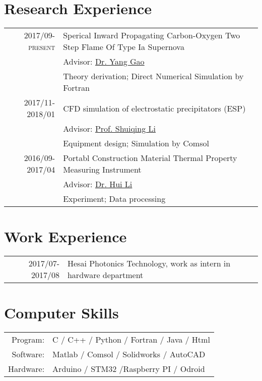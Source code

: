 \documentclass[a4paper,10pt]{article}
\begin{document}
\section{Research Experience}
\begin{tabular}{rl}
\textsc{2017/09-present} & Sperical Inward Propagating Carbon-Oxygen Two Step Flame Of Type Ia Supernova \\
                         & \small Advisor: \href{http://www.tsinghua.edu.cn/publish/teen/2472/2016/20160429193334896914447/20160429193334896914447_.html}{Dr. Yang Gao} \\
                         & Theory derivation; Direct Numerical Simulation by Fortran \\
\textsc{2017/11-2018/01} & CFD simulation of electrostatic precipitators (ESP)\\
                         & \small Advisor: \href{http://www.tsinghua.edu.cn/publish/teen/2472/2010/20101222191303970621540/20101222191303970621540_.html}{Prof. Shuiqing Li} \\
                         & Equipment design; Simulation by Comsol \\
\textsc{2016/09-2017/04} & Portabl Construction Material Thermal Property Measuring Instrument \\
                         & \small Advisor: \href{http://www.tsinghua.edu.cn/publish/te/2230/2017/20170816112830349410941/20170816112830349410941_.html}{Dr. Hui Li} \\
                         & Experiment; Data processing \\
\end{tabular}

\section{Work Experience}
\begin{tabular}{rl}
\textsc{2017/07-2017/08} &  Hesai Photonics Technology, work as intern in hardware department \\
\end{tabular}

\section{Computer Skills}
\begin{tabular}{rl}
Program: & C / C++ / Python / Fortran / Java / Html \\
Software:& Matlab / Comsol / Solidworks / AutoCAD   \\
Hardware:& Arduino / STM32 /Raspberry PI / Odroid   \\
\end{tabular}
\end{document}

